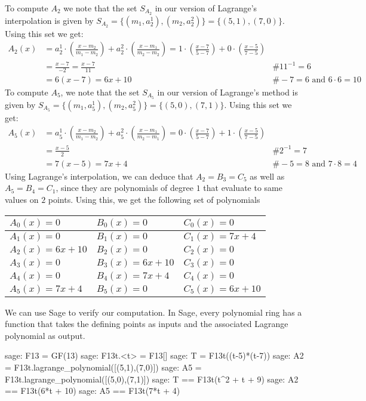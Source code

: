 \begin{example}[3-factorization]
To compute $A_2$ we note that the set $S_{A_2}$ in our version of Lagrange's interpolation  is given by $S_{A_2}=\{(m_1,a^1_2), (m_2,a_2^2)\} = \{(5,1), (7,0)\}$. Using this set we get:
\begin{align*}
A_2(x) & = a^1_2\cdot(\frac{x-m_2}{m_1-m_2}) + a^2_2\cdot(\frac{x-m_1}{m_2-m_2})
      = 1\cdot(\frac{x-7}{5-7}) + 0\cdot(\frac{x-5}{7-5}) \\
    & = \frac{x-7}{-2}
      = \frac{x-7}{11} & \text{\# } 11^{-1}=6 \\
    & = 6(x-7) 
      = 6x + 10 & \text{\# } -7 = 6 \text{ and } 6\cdot 6 = 10
\end{align*}
To compute $A_5$, we note that the set $S_{A_5}$ in our version of Lagrange's method  is given by $S_{A_5}=\{(m_1,a^1_5), (m_2,a^2_5)\} = \{(5,0), (7,1)\}$. Using this set we get:
\begin{align*}
A_5(x) & = a^1_5\cdot(\frac{x-m_2}{m_1-m_2}) + a^2_5\cdot(\frac{x-m_1}{m_2-m_1})
      = 0\cdot(\frac{x-7}{5-7}) + 1\cdot(\frac{x-5}{7-5}) \\
    & = \frac{x-5}{2} & \text{\# } 2^{-1}=7 \\
    & = 7(x-5) 
      = 7x + 4 & \text{\# } -5 = 8 \text{ and } 7\cdot 8 = 4
\end{align*}
Using Lagrange's interpolation, we can deduce that $A_2=B_3=C_5$ as well as $A_5=B_4=C_1$, since they are polynomials of degree $1$ that evaluate to same values on $2$ points. Using this, we get the following set of polynomials
\begin{center}
\begin{tabular}{|l|l|l|}\hline 
$A_{0}(x)=0 $ &$ B_{0}(x)=0   $ & $C_{0}(x)=0$ \tabularnewline\hline 
$A_1(x)=0 $ &$ B_1(x)=0   $ & $C_1(x)=7x+4$ \tabularnewline\hline 
$A_2(x)=6x+10$ &$ B_2(x)=0$ & $C_2(x)=0$ \tabularnewline\hline 
$A_3(x)=0    $ &$ B_3(x)=6x+10$ & $C_3(x)=0$ \tabularnewline\hline 
$A_4(x)=0$ &$ B_4(x)=7x+4  $ & $C_4(x)=0$ \tabularnewline\hline 
$A_5(x)=7x+4$ &$ B_5(x)=0      $ & $C_5(x)=6x+10$ \tabularnewline\hline 
\end{tabular}
\end{center}
We can use Sage to verify our computation. In Sage, every polynomial ring has a function  that takes the defining points as inputs and the associated Lagrange polynomial as output.
\begin{sagecommandline}
sage: F13 = GF(13)
sage: F13t.<t> = F13[]
sage: T = F13t((t-5)*(t-7))
sage: A2 = F13t.lagrange_polynomial([(5,1),(7,0)])
sage: A5 = F13t.lagrange_polynomial([(5,0),(7,1)])
sage: T == F13t(t^2 + t + 9)
sage: A2 == F13t(6*t + 10)
sage: A5 == F13t(7*t + 4)
\end{sagecommandline}


\end{example}
